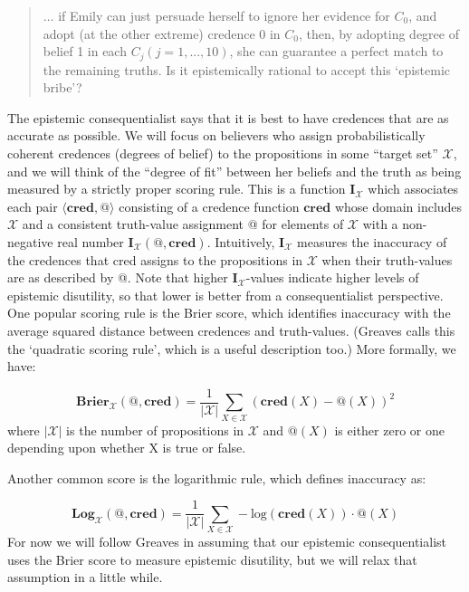 \begin{quote}

$\ldots$ if Emily can just persuade herself to ignore her evidence for $C_0$, and adopt (at the other extreme) credence 0 in $C_0$, then, by adopting degree of belief 1 in each $C_{j} (j = 1, ... , 10)$, she can guarantee a perfect match to the remaining truths. Is it epistemically rational to accept this `epistemic bribe'?  \citet[918]{Greaves2013}
\end{quote}
The epistemic consequentialist says that it is best to have credences that are as accurate as possible. We will focus on believers who assign probabilistically coherent credences (degrees of belief) to the propositions in some ``target set'' $\mathscr{X}$, and we will think of the ``degree of fit'' between her beliefs and the truth as being measured by a strictly proper scoring rule. This is a function $\mathbf{I}_{\mathscr{X}}$ which associates each pair $\langle \mathbf{cred}, @ \rangle$ consisting of a credence function $\mathbf{cred}$ whose domain includes $\mathscr{X}$ and a consistent truth-value assignment @ for elements of $\mathscr{X}$ with a non-negative real number $\mathbf{I}_{\mathscr{X}}(@, \mathbf{cred})$. Intuitively, $\mathbf{I}_{\mathscr{X}}$ measures the inaccuracy of the credences that cred assigns to the propositions in $\mathscr{X}$ when their truth-values are as described by @. Note that higher $\mathbf{I}_{\mathscr{X}}$-values indicate higher levels of epistemic disutility, so that lower is better from a consequentialist perspective. One popular scoring rule is the Brier score, which identifies inaccuracy with the average squared distance between credences and truth-values. (Greaves calls this the `quadratic scoring rule', which is a useful description too.) More formally, we have:

$$\mathbf{Brier}_{\mathscr{X}}(@, \mathbf{cred}) = \frac{1}{|\mathscr{X}|}\sum_{X \in \mathscr{X}} (\mathbf{cred}(X) - @(X))^2$$
where $|\mathscr{X}|$ is the number of propositions in $\mathscr{X}$ and $@(X)$ is either zero or one depending upon whether X is true or false. 

Another common score is the logarithmic rule, which defines inaccuracy as:

$$\mathbf{Log}_{\mathscr{X}}(@, \mathbf{cred}) = \frac{1}{|\mathscr{X}|}\sum_{X \in \mathscr{X}} -\text{log}(\mathbf{cred}(X)) \cdot @(X)$$
For now we will follow Greaves in assuming that our epistemic consequentialist uses the Brier score to measure epistemic disutility, but we will relax that assumption in a little while.


